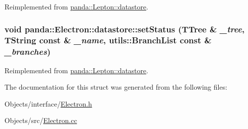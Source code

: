 Reimplemented from \hyperlink{structpanda_1_1Lepton_1_1datastore_a01bc67f154130787caab05786b3169c6}{panda::Lepton::datastore}.\hypertarget{structpanda_1_1Electron_1_1datastore_af2c384514f539bcc78e55284b7eb3b67}{
\subsubsection[{setStatus}]{\setlength{\rightskip}{0pt plus 5cm}void panda::Electron::datastore::setStatus (TTree \& {\em \_\-tree}, \/  TString const \& {\em \_\-name}, \/  {\bf utils::BranchList} const \& {\em \_\-branches})}}
\label{structpanda_1_1Electron_1_1datastore_af2c384514f539bcc78e55284b7eb3b67}


Reimplemented from \hyperlink{structpanda_1_1Lepton_1_1datastore_a0a158cefd0f32a98625eb5736c414b01}{panda::Lepton::datastore}.

The documentation for this struct was generated from the following files:\begin{DoxyCompactItemize}
\item 
Objects/interface/\hyperlink{Electron_8h}{Electron.h}\item 
Objects/src/\hyperlink{Electron_8cc}{Electron.cc}\end{DoxyCompactItemize}
